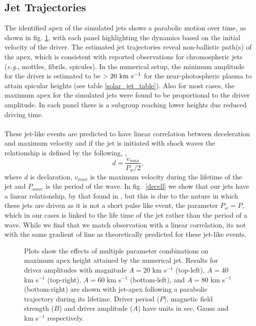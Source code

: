 \documentclass[12pt]{ociamthesis}
\newcommand{\np}{\\ \\}
\begin{document}
\subsection{Jet Trajectories}
\label{subsec:jet_traj}
The identified apex of the simulated jets shows a parabolic motion over time, as shown in fig. \ref{jet_traj}, with each panel highlighting the dynamics based on the initial velocity of the driver. The estimated jet trajectories reveal non-ballistic path(s) of the apex, which is consistent with reported observations \citep{Hansteen2006ApJ, Rouppe2007ApJ660L169R, Pontieu2007PASJ} for chromospheric jets (\textit{e.g.}, mottles, fibrils, spicules). In the numerical setup, the minimum amplitude for the driver is estimated to be $>20 ~\rm{km ~s^{-1}}$ for the near-photospheric plasma to attain spicular heights (see table \ref{solar_jet_table}). Also for most cases, the maximum apex for the simulated jets were found to be proportional to the driver amplitude. In each panel there is a subgroup reaching lower heights due reduced driving time. \np  
%
These jet-like events are predicted to have linear correlation between deceleration and maximum velocity and if the jet is initiated with shock waves the relationship is defined by the following, \citep{Heggland2007ApJ6661277H},
\begin{equation} \label{trend_heg}
d = \frac{v_{max}}{P_{w}/2},
\end{equation}
where $d$ is declaration, $v_{max}$ is the maximum velocity during the lifetime of the jet and $P_{wave}$ is the period of the wave. In fig.~\ref{decell} we show that our jets have a linear relationship, by that found in \citep{Heggland2007ApJ6661277H}, but this is due to the nature in which these jets are driven as it is not a short pulse like event, the parameter $P_{w}=P$, which in our cases is linked to the life time of the jet rather than the period of a wave. While we find that we match observation with a linear correlation, its not with the same gradient of line as theoretically predicted for these jet-like events.
\begin{figure}
\captionsetup[subfigure]{labelformat=empty}
\centering
{} 
\caption{Plots show the effects of multiple parameter combinations on maximum apex height attained by the numerical jet. Results for driver amplitudes with magnitude $A = 20$ km s$^{-1}$ (top-left), $A = 40$ km s$^{-1}$ (top-right), $A = 60$ km s$^{-1}$ (bottom-left), and $A = 80$ km s$^{-1}$ (bottom-right) are shown with jet-apex following a parabolic trajectory during its lifetime. Driver period ($P$), magnetic field strength ($B$) and driver amplitude ($A$) have units in sec, Gauss and km s$^{-1}$ respectively.}
\label{jet_traj}
\end{figure}
\end{document}
